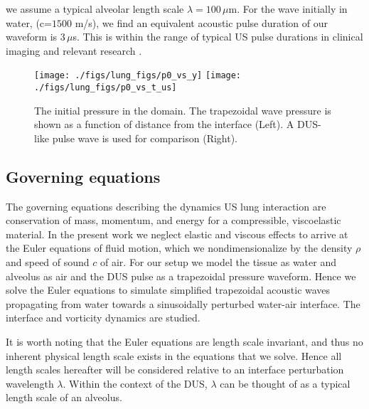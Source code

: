 we assume a typical alveolar length scale
$\lambda=100 \, \mu$m. For the wave initially in water, (c=$1500$
m/s), we find an equivalent acoustic pulse duration of our waveform is
$3 \, \mu$s.  This is within the range of typical \ac{US} pulse
durations in clinical imaging \citep{Edelman2005} and relevant
research \citep{Obrien2006b}.
%
\begin{figure}%
  \centering%
  \texttt{[image: ./figs/lung\_figs/p0\_vs\_y]}%
  \texttt{[image: ./figs/lung\_figs/p0\_vs\_t\_us]}%
  \caption[Trapezoidal and \ac{DUS} pulse waves]{The initial pressure in the domain. The trapezoidal wave
    pressure is shown as a function of distance from the interface
    (Left). A \ac{DUS}-like pulse wave is used for comparison
    (Right).}%
  \label{fig:p0}
\end{figure}
%
\subsection{Governing equations}
The governing equations describing the dynamics \ac{US} lung
interaction are conservation of mass, momentum, and energy for a
compressible, viscoelastic material. In the present work we neglect
elastic and viscous effects to arrive at the Euler equations of fluid
motion, which we nondimensionalize by the density $\rho$ and speed of
sound $c$ of air.  For our setup we model the tissue as water and
alveolus as air and the \ac{DUS} pulse as a trapezoidal pressure
waveform. Hence we solve the Euler equations to simulate simplified
trapezoidal acoustic waves propagating from water towards a
sinusoidally perturbed water-air interface. The interface and
vorticity dynamics are studied.

It is worth noting that the Euler equations are length scale invariant, and
thus no inherent physical length scale exists in the equations that we
solve. Hence all length scales hereafter will be considered relative
to an interface perturbation wavelength $\lambda$. Within the context
of the \ac{DUS}, $\lambda$ can be thought of as a typical length scale
of an alveolus.

